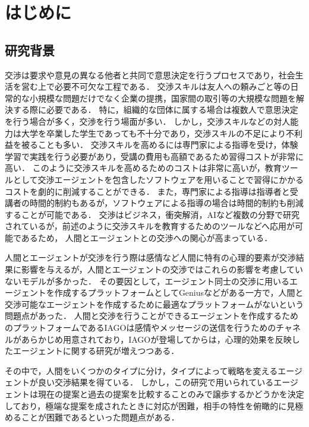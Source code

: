 

\chapter{はじめに}
\section{研究背景}
交渉は要求や意見の異なる他者と共同で意思決定を行うプロセスであり，社会生活を営む上で必要不可欠な工程である．
交渉スキルは友人への頼みごと等の日常的な小規模な問題だけでなく企業の提携，国家間の取引等の大規模な問題を解決する際に必要である．
特に，組織的な団体に属する場合は複数人で意思決定を行う場合が多く，交渉を行う場面が多い\cite{negSurvey}．
しかし，交渉スキルなどの対人能力は大学を卒業した学生であっても不十分であり\cite{graduate}，交渉スキルの不足により不利益を被ることも多い．
交渉スキルを高めるには専門家による指導を受け，体験学習で実践を行う必要があり，受講の費用も高額であるため習得コストが非常に高い．
このように交渉スキルを高めるためのコストは非常に高いが，教育ツールとして交渉エージェントを包含したソフトウェアを用いることで習得にかかるコストを劇的に削減することができる．
また，専門家による指導は指導者と受講者の時間的制約もあるが，ソフトウェアによる指導の場合は時間的制約も削減することが可能である．
交渉はビジネス，衝突解消，AIなど複数の分野で研究されているが，前述のように交渉スキルを教育するためのツールなどへ応用が可能であるため，
人間とエージェントとの交渉への関心が高まっている\cite{vr}．

人間とエージェントが交渉を行う際は感情など人間に特有の心理的要素が交渉結果に影響を与えるが，人間とエージェントの交渉ではこれらの影響を考慮していないモデルが多かった．
その要因として，エージェント同士の交渉に用いるエージェントを作成するプラットフォームとしてGenius\cite{genius}などがある一方で，人間と交渉可能なエージェントを作成するために最適なプラットフォームがないという問題点があった．
人間と交渉を行うことができるエージェントを作成するためのプラットフォームであるIAGO\cite{iago}は感情やメッセージの送信を行うためのチャネルがあらかじめ用意されており，IAGOが登場してからは，心理的効果を反映したエージェントに関する研究が増えつつある．


その中で，人間をいくつかのタイプに分け，タイプによって戦略を変えるエージェントが良い交渉結果を得ている\cite{tki-ha}．
しかし，この研究で用いられているエージェントは現在の提案と過去の提案を比較することのみで譲歩するかどうかを決定しており，極端な提案を成されたときに対応が困難，相手の特性を俯瞰的に見極めることが困難であるといった問題点がある．


